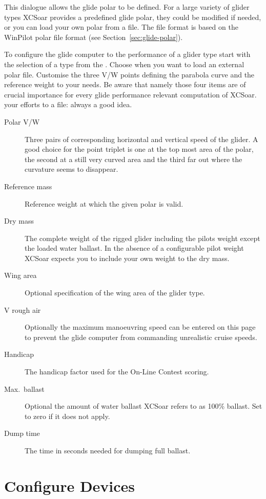 This dialogue allows the glide polar to be defined. For a large variety of glider
types XCSoar provides a predefined glide polar, they could be modified if 
needed, or you can load your own polar from a file. 
The file format is based on the WinPilot polar file format (see Section~\ref{sec:glide-polar}).

\label{conf:polar} To configure the glide computer to the performance of a glider 
type start with the selection of a type from the . 
Choose  when you want to load an external polar file.
Customise the three V/W points defining the parabola curve and the reference
weight to your needs. 
\tip Be aware that namely those four items are of crucial importance 
for every glide performance relevant computation of XCSoar.   
 your efforts to a file: always a good idea.

\begin{description}
\item[Polar V/W]  Three pairs of corresponding horizontal and vertical speed of the glider. 
  A good choice for the point triplet is one at the top most area of the polar, the second at a 
  still very curved area and the third far out where the curvature seems to disappear.
\item[Reference mass]  Reference weight at which the given polar is valid.
\item[Dry mass]  The complete weight of the rigged glider including the pilots weight except the 
  loaded water ballast. 
  In the absence of a configurable pilot weight XCSoar expects you to include your own weight
  to the dry mass.
\item[Wing area]  Optional specification of the wing area of the glider type.
\item[V rough air] Optionally the maximum manoeuvring speed can
  be entered on this page to prevent the glide computer from commanding 
  unrealistic cruise speeds.
\item[Handicap]  The handicap factor used for the On-Line Contest scoring.
\item[Max.\ ballast]  Optional the amount of water ballast XCSoar refers to as 100\% ballast.
  Set to zero if it does not apply.
\item[Dump time]  The time in seconds needed for dumping full ballast.
\end{description}


\section{Configure Devices} \label{conf:comdevices}

